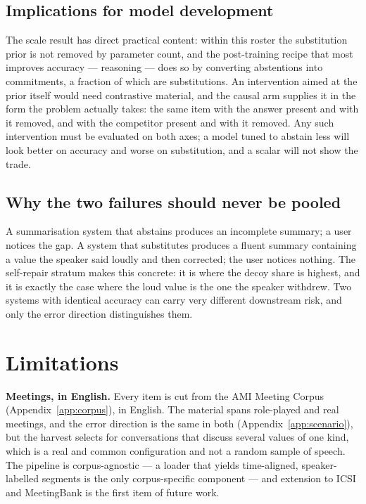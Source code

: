 \documentclass{article}
\newcommand{\corpus}{the AMI Meeting Corpus}
\newcommand{\plannedcorpus}{ICSI and MeetingBank}
\begin{document}
\subsection{Implications for model development}
The scale result has direct practical content: within this roster the
substitution prior is not removed by parameter count, and the post-training
recipe that most improves accuracy --- reasoning --- does so by converting
abstentions into commitments, a fraction of which are substitutions. An
intervention aimed at the prior itself would need contrastive material, and
the causal arm supplies it in the form the problem actually takes: the same
item with the answer present and with it removed, and with the competitor
present and with it removed. Any such intervention must be evaluated on both
axes; a model tuned to abstain less will look better on accuracy and worse
on substitution, and a scalar will not show the trade.

\subsection{Why the two failures should never be pooled}
A summarisation system that abstains produces an incomplete summary; a user
notices the gap. A system that substitutes produces a fluent summary
containing a value the speaker said loudly and then corrected; the user
notices nothing. The self-repair stratum makes this concrete: it is where the
decoy share is highest, and it is exactly the case where the loud value is
the one the speaker withdrew. Two systems with identical accuracy can carry
very different downstream risk, and only the error direction distinguishes
them.

\section{Limitations}
\label{sec:limits}

\textbf{Meetings, in English.} Every item is cut from \corpus{}
(Appendix~\ref{app:corpus}), in English. The material spans role-played and
real meetings, and the error direction is the same in both
(Appendix~\ref{app:scenario}), but the harvest selects for conversations
that discuss several values of one kind, which is a real and common
configuration and not a random sample of speech. The pipeline is
corpus-agnostic --- a loader that yields time-aligned, speaker-labelled
segments is the only corpus-specific component --- and extension to
\plannedcorpus{} is the first item of future work.
\end{document}
